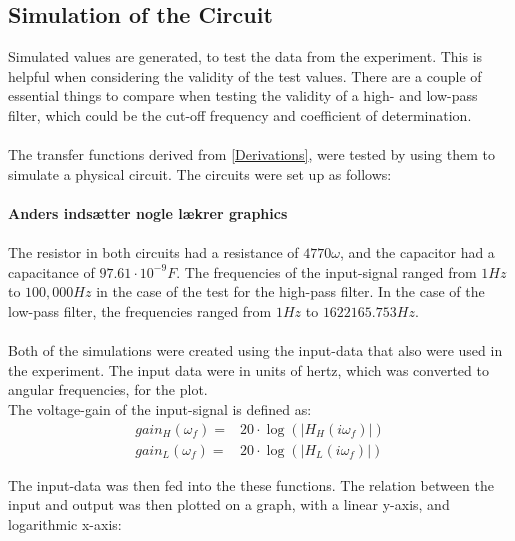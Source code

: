 \subsection{Simulation of the Circuit}
Simulated values are generated, to test the data from the experiment. This is helpful when considering the validity of the test values. There are a couple of essential things to compare when testing the validity of a high- and low-pass filter, which could be the cut-off frequency and coefficient of determination. 
\\ \\
The transfer functions derived from \cref{Derivations}, were tested by using them to simulate a physical circuit. The circuits were set up as follows:
\\
\\
\textbf{Anders indsætter nogle lækrer graphics} 
\\
\\
The resistor in both circuits had a resistance of $4770 \omega$, and the capacitor had a capacitance of $97.61\cdot 10^{-9} F$. The frequencies of the input-signal ranged from $1 Hz$ to $100,000 Hz$ in the case of the test for the high-pass filter. In the case of the low-pass filter, the frequencies ranged from $1 Hz$ to $1622165.753 Hz$.
\\
\\
Both of the simulations were created using the input-data that also were used in the experiment. The input data were in units of hertz, which was converted to angular frequencies, for the plot.
\\
The voltage-gain of the input-signal is defined as:
\begin{align*}
	gain_H(\omega _f) =&20 \cdot \log{\left( \left|H_{H}(i \omega_f)\right| \right)}
	\\
	gain_L(\omega _f) =&20 \cdot \log{\left( \left|H_{L}(i \omega_f)\right| \right)}
\end{align*}

\noindent The input-data was then fed into the these functions. The relation between the input and output was then plotted on a graph, with a linear y-axis, and logarithmic x-axis:

